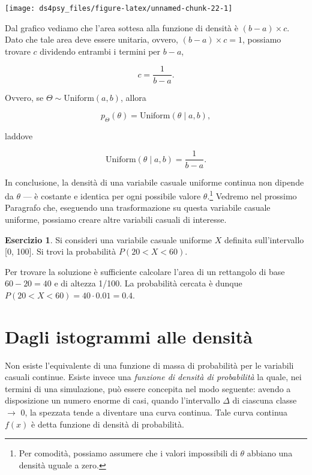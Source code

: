 \documentclass[
  11pt,
]{krantz}
\theoremstyle{definition}
\theoremstyle{definition}
\theoremstyle{definition}
\newtheorem{exercise}{Esercizio}[chapter]
\theoremstyle{definition}
\theoremstyle{remark}
\begin{document}
\begin{center}\texttt{[image: ds4psy\_files/figure-latex/unnamed-chunk-22-1]} \end{center}

\noindent Dal grafico vediamo che l'area sottesa alla funzione di densità è \((b - a)\times c\). Dato che tale area deve essere unitaria, ovvero, \((b - a) \times c = 1\), possiamo trovare \(c\) dividendo entrambi i termini per \(b - a\),

\[
c  = \frac{\displaystyle{1}}{\displaystyle b - a}.
\]

Ovvero, se \(\Theta \sim \mbox{Uniform}(a, b)\), allora

\[
p_{\Theta}(\theta) = \mbox{Uniform}(\theta \mid a, b),
\]

laddove

\[
\mbox{Uniform}(\theta \mid a, b) = \frac{1}{b - a}.
\]

In conclusione, la densità di una variabile casuale uniforme continua non dipende da \(\theta\) --- è costante e identica per ogni possibile valore \(\theta\).\footnote{Per comodità, possiamo assumere che i valori impossibili di \(\theta\) abbiano una densità uguale a zero.} Vedremo nel prossimo Paragrafo che, eseguendo una trasformazione su questa variabile casuale uniforme, possiamo creare altre variabili casuali di interesse.

\begin{exercise}
Si consideri una variabile casuale uniforme \(X\) definita sull'intervallo {[}0, 100{]}. Si trovi la probabilità \(P(20 < X < 60)\).

Per trovare la soluzione è sufficiente calcolare l'area di un rettangolo di base \(60 - 20 = 40\) e di altezza 1/100. La probabilità cercata è dunque \(P(20 < X < 60) = 40 \cdot 0.01 = 0.4\).
\end{exercise}

\hypertarget{dagli-istogrammi-alle-densituxe0}{%
\section{Dagli istogrammi alle densità}\label{dagli-istogrammi-alle-densituxe0}}

Non esiste l'equivalente di una funzione di massa di probabilità per le variabili casuali continue. Esiste invece una \emph{funzione di densità di probabilità} la quale, nei termini di una simulazione, può essere concepita nel modo seguente: avendo a disposizione un numero enorme di casi, quando l'intervallo \(\Delta\) di ciascuna classe \(\rightarrow\) 0, la spezzata tende a diventare una curva continua. Tale curva continua \(f(x)\) è detta funzione di densità di probabilità.
\end{document}

